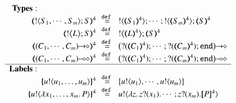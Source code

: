 \begin{figure}[t]
\small
\[
\begin{array}{rcl}
{\bf Types:}\hspace{2.5cm}\\
		\tmap{\btout{S_1, \cdots, S_m}S}{4}
		&\!\!\defeq\!\!&
		\btout{\tmap{S_1}{4}} \cdots ; \btout{\tmap{S_m}{4}}\tmap{S}{4}
		\\
		\tmap{\bbtout{L} S}{4}
		&\!\!\defeq\!\!&
		\bbtout{\mapt{L}^{4}}\mapt{S}^{4}
		\\
		\tmap{\shot{(C_1, \cdots, C_m)}}{4}
		&\!\!\defeq\!\!&
		\shot{\big(\btinp{\tmap{C_1}{4}} \cdots; \btinp{\tmap{C_m}{4}}\tinact\big)}
		\\
		\tmap{\lhot{(C_1, \cdots, C_m)}}{4}
		&\!\!\defeq\!\!&
		\lhot{\big(\btinp{\tmap{C_1}{4}} \cdots; \btinp{\tmap{C_m}{4}}\tinact\big)}
		\\
\hline
{\bf Labels:}\hspace{2.5cm}\\
		\mapa{\bactout{u}{u_1, \ldots, u_m}}^4 
		&\!\!\defeq\!\!&
 \big\{\bactout{u}{u_1}, \cdots, \bactout{u}{u_m}\big\} \\
		\mapa{\bactout{u}{\abs{x_1, \ldots, x_m}{P}} }^4 
		&\!\!\defeq\!\!&
\bactout{u}{\abs{z}\binp{z}{x_1} \cdots ; \binp{z}{x_m} \map{P}^{4}}\\

\end{array}\]
\end{figure}
